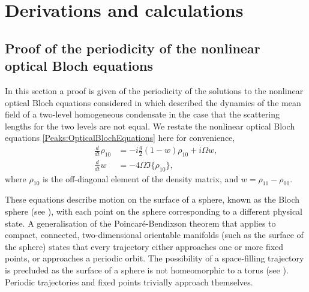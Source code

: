 \chapter{Derivations and calculations}
\label{MethodsAppendix}
\graphicspath{{Figures/MethodsAppendix/}{Figures/Common/}}


\section{Proof of the periodicity of the nonlinear optical Bloch equations}
\label{MethodsAppendix:OpticalBlochPeriodicityProof}
In this section a proof is given of the periodicity of the solutions to the nonlinear optical Bloch equations considered in  which described the dynamics of the mean field of a two-level homogeneous condensate in the case that the scattering lengths for the two levels are not equal. We restate the nonlinear optical Bloch equations \eqref{Peaks:OpticalBlochEquations} here for convenience,
\begin{subequations}
    \label{MethodsAppendix:OpticalBlochEquations}
    \begin{align}
        \frac{d}{dt}\rho_{10} &= -i\frac{g}{2} (1-w)\rho_{10} + i \Omega w,\\
        \frac{d }{dt}w &= -4 \Omega \Im\{\rho_{10}\},
    \end{align}
\end{subequations}
where $\rho_{10}$ is the off-diagonal element of the density matrix, and $w = \rho_{11} - \rho_{00}$.

These equations describe motion on the surface of a sphere, known as the Bloch sphere (see ), with each point on the sphere corresponding to a different physical state.  A generalisation of the Poincaré-Bendixson theorem that applies to compact, connected, two-dimensional orientable manifolds \citep{Schwartz:1963} (such as the surface of the sphere) states that every trajectory either approaches one or more fixed points, or approaches a periodic orbit.  The possibility of a space-filling trajectory is precluded as the surface of a sphere is not homeomorphic to a torus (see \citep{Schwartz:1963}).  Periodic trajectories and fixed points trivially approach themselves.

